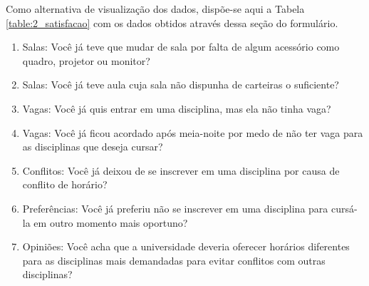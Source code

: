         Como alternativa de visualização dos dados, dispõe-se aqui a Tabela \ref{table:2_satisfacao} com os dados obtidos através dessa seção do formulário.

        \begin{enumerate}
            \item Salas: Você já teve que mudar de sala por falta de algum acessório como quadro, projetor ou monitor?
            \item Salas: Você já teve aula cuja sala não dispunha de carteiras o suficiente?
            \item Vagas: Você já quis entrar em uma disciplina, mas ela não tinha vaga?
            \item Vagas: Você já ficou acordado após meia-noite por medo de não ter vaga para as disciplinas que deseja cursar?
            \item Conflitos: Você já deixou de se inscrever em uma disciplina por causa de conflito de horário?
            \item Preferências: Você já preferiu não se inscrever em uma disciplina para cursá-la em outro momento mais oportuno?
            \item Opiniões: Você acha que a universidade deveria oferecer horários diferentes para as disciplinas mais demandadas para evitar conflitos com outras disciplinas?
        \end{enumerate}

